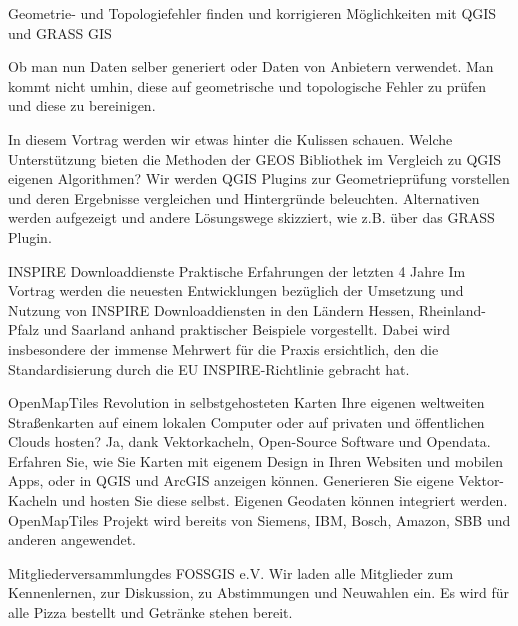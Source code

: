 %
{Geometrie- und Topologiefehler finden und korrigieren}%
{Möglichkeiten mit QGIS und GRASS GIS}%
{%
Ob man nun Daten selber generiert oder Daten von Anbietern verwendet. Man kommt nicht umhin, diese auf geometrische und topologische Fehler zu prüfen und diese zu bereinigen. 

In diesem Vortrag werden wir etwas hinter die Kulissen schauen. Welche Unterstützung bieten die Methoden der GEOS Bibliothek im Vergleich zu QGIS eigenen Algorithmen? Wir werden QGIS Plugins zur Geometrieprüfung vorstellen und deren Ergebnisse vergleichen und Hintergründe beleuchten. Alternativen werden aufgezeigt und andere Lösungswege skizziert, wie z.B. über das GRASS Plugin.%
}

%
{INSPIRE Downloaddienste}%
{Praktische Erfahrungen der letzten 4 Jahre}%
{%
Im Vortrag werden die neuesten Entwicklungen bezüglich der Umsetzung und Nutzung von INSPIRE Downloaddiensten in den Ländern Hessen, Rheinland-Pfalz und Saarland anhand praktischer Beispiele vorgestellt. Dabei wird insbesondere der immense Mehrwert für die Praxis ersichtlich, den die Standardisierung durch die EU INSPIRE-Richtlinie gebracht hat.%
}

%
{OpenMapTiles}%
{Revolution in selbstgehosteten Karten}%
{%
Ihre eigenen weltweiten Straßenkarten auf einem lokalen Computer oder auf privaten und öffentlichen Clouds hosten? Ja, dank Vektorkacheln, Open-Source Software und Opendata. Erfahren Sie, wie Sie Karten mit eigenem Design in Ihren Websiten und mobilen Apps, oder in QGIS und ArcGIS anzeigen können. Generieren Sie eigene Vektor-Kacheln und hosten Sie diese selbst. Eigenen Geodaten können integriert werden. OpenMapTiles Projekt wird bereits von Siemens, IBM, Bosch, Amazon, SBB und anderen angewendet.%
}

\abstractZwei{}%
{Mitgliederversammlung\linebreak des FOSSGIS e.V.}%
{}%
{%
Wir laden alle Mitglieder zum
Kennenlernen, zur Diskussion, zu Abstimmungen und Neuwahlen ein. Es wird für alle Pizza bestellt und Getränke
stehen bereit.%
}
